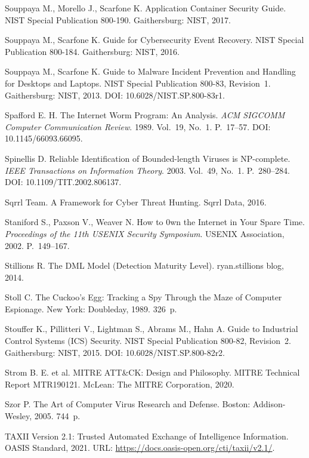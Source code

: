  Souppaya M., Morello J., Scarfone K. Application Container Security Guide. NIST Special Publication 800-190. Gaithersburg: NIST, 2017.

 Souppaya M., Scarfone K. Guide for Cybersecurity Event Recovery. NIST Special Publication 800-184. Gaithersburg: NIST, 2016.

 Souppaya M., Scarfone K. Guide to Malware Incident Prevention and Handling for Desktops and Laptops. NIST Special Publication 800-83, Revision~1. Gaithersburg: NIST, 2013. DOI: 10.6028/NIST.SP.800-83r1.

 Spafford E. H. The Internet Worm Program: An Analysis. \emph{ACM SIGCOMM Computer Communication Review}. 1989. Vol.~19, No.~1. P.~17--57. DOI: 10.1145/66093.66095.

 Spinellis D. Reliable Identification of Bounded-length Viruses is NP-complete. \emph{IEEE Transactions on Information Theory}. 2003. Vol.~49, No.~1. P.~280--284. DOI: 10.1109/TIT.2002.806137.

 Sqrrl Team. A Framework for Cyber Threat Hunting. Sqrrl Data, 2016.

 Staniford S., Paxson V., Weaver N. How to 0wn the Internet in Your Spare Time. \emph{Proceedings of the 11th USENIX Security Symposium}. USENIX Association, 2002. P.~149--167.

 Stillions R. The DML Model (Detection Maturity Level). ryan.stillions blog, 2014.

 Stoll C. The Cuckoo's Egg: Tracking a Spy Through the Maze of Computer Espionage. New York: Doubleday, 1989. 326~p.

 Stouffer K., Pillitteri V., Lightman S., Abrams M., Hahn A. Guide to Industrial Control Systems (ICS) Security. NIST Special Publication 800-82, Revision~2. Gaithersburg: NIST, 2015. DOI: 10.6028/NIST.SP.800-82r2.

 Strom B. E. et al. MITRE ATT\&CK: Design and Philosophy. MITRE Technical Report MTR190121. McLean: The MITRE Corporation, 2020.

 Szor P. The Art of Computer Virus Research and Defense. Boston: Addison-Wesley, 2005. 744~p.

 TAXII Version 2.1: Trusted Automated Exchange of Intelligence Information. OASIS Standard, 2021. URL: \url{https://docs.oasis-open.org/cti/taxii/v2.1/}.

